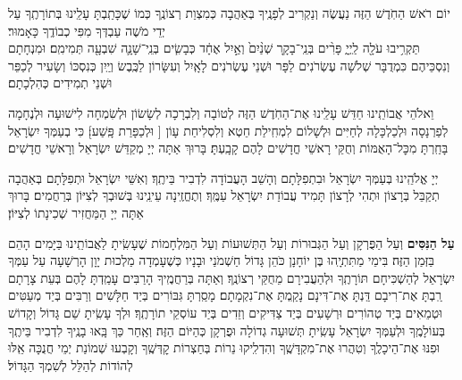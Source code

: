 \documentclass[twoside, openany, parskip=half, 11pt]{book}
\begin{document}
יוֹם רֹאשׁ הַחֹֽדֶשׁ
הַזֶּה נַעֲשֶׂה וְנַקְרִיב לְפָנֶֽיךָ בְּאַהֲבָה כְּמִצְוַת רְצוֹנֶֽךָ כְּמוֹ שֶׁכָּתַֽבְתָּ עָלֵֽינוּ בְּתוֹרָתֶֽךָ עַל יְדֵי מֹשֶׁה עַבְדְּךָ מִפִּי כְבוֹדֶֽךָ כָּאָמוּר׃\\
תַּקְרִ֥יבוּ עֹלָ֖ה לַֽיְיָ֑ פָּרִ֨ים בְּנֵֽי־בָקָ֤ר שְׁנַ֨יִם֙ וְאַ֣יִל אֶחָ֔ד כְּבָשִׂ֧ים בְּנֵֽי־שָׁנָ֛ה שִׁבְעָ֖ה תְּמִימִֽם׃ וּמִנְחָתָם וְנִסְכֵּיהֶם כִּמְדֻבָּר שְׁלֹשָׁה עֶשְׂרֹנִים לַפָּר וּשְׁנֵי עֶשְׂרֹנִים לָאָֽיִל וְעִשָּׂרוֹן לַכֶּֽבֶשׂ וְיַֽיִן כְּנִסְכּוֹ וְשָׂעִיר לְכַפֵּר וּשְׁנֵי תְמִידִים כְּהִלְכָתָם׃

וֵאלֹהֵי אֲבוֹתֵֽינוּ חַדֵּשׁ עָלֵֽינוּ אֶת־הַחֹֽדֶשׁ הַזֶּה לְטוֹבָה וְלִבְרָכָה לְשָׂשׂוֹן וּלְשִׂמְחָה לִישׁוּעָה וּלְנֶחָמָה לְפַרְנָסָה וּלְכַלְכָּלָה לְחַיִּים וּלְשָׁלוֹם לִמְחִֽילַת חֵטְא וְלִסְלִיחַת עָוֹן [
וּלְכַפָּרַת פָּֽשַׁע]׃ כִּי בְעַמְּךָ יִשְׂרָאֵל בָּחַֽרְתָּ מִכׇּל־הָאֻמּוֹת וְחֻקֵּי רָאשֵׁי חֳדָשִׁים לָהֶם קָבָֽעְתָּ׃ בָּרוּךְ אַתָּה יְיָ מְקַדֵּשׁ יִשְׂרָאֵל וְרָאשֵׁי חֳדָשִׁים׃

יְיָ אֱלֹהֵֽינוּ בְּעַמְּךָ יִשְׂרָאֵל וּבִתְפִלָּתָם וְהָשֵׁב הָעֲבוֹדָה לִדְבִיר בֵּיתֶֽךָ׃ וְאִשֵּׁי יִשְׂרָאֵל וּתְפִלָּתָם בְּאַהֲבָה תְקַבֵּל בְּרָצוֹן וּתְהִי לְרָצוֹן תָּמִיד עֲבוֹדַת יִשְׂרָאֵל עַמֶּֽךָ׃ וְתֶחֱזֶֽינָה עֵינֵֽינוּ בְּשׁוּבְךָ לְצִיּוֹן בְּרַחֲמִים׃ בָּרוּךְ אַתָּה יְיָ הַמַּחֲזִיר שְׁכִינָתוֹ לְצִיּוֹן׃

\modim

\enlargethispage{\baselineskip}

\begin{sometimes}

\textbf{עַל הַנִּסִּים}
וְעַל הַפֻּרְקָן וְעַל הַגְּבוּרוֹת וְעַל הַתְּשׁוּעוֹת וְעַל הַמִּלְחָמוֹת
שֶׁעָשִֽׂיתָ לַאֲבוֹתֵֽינוּ בַּיָּמִים הָהֵם בַּזְּמַן הַזֶּה׃
בִּימֵי מַתִּתְיָֽהוּ בֶּן יוֹחָנָן כֹּהֵן גָּדוֹל חַשְׁמֹנַי וּבָנָיו כְּשֶׁעָמְדָה מַלְכוּת יָוָן הָרְשָׁעָה עַל עַמְּךָ יִשְׂרָאֵל לְהַשְׁכִּיחָם תּוֹרָתֶֽךָ וּלְהַעֲבִירָם מֵחֻקֵּי רְצוֹנֶֽךָ׃ וְאַתָּה בְּרַחֲמֶֽיךָ הָרַבִּים עָמַֽדְתָּ לָהֶם בְּעֵת צָרָתָם רַֽבְתָּ אֶת־רִיבָם דַּֽנְתָּ אֶת־דִּינָם נָקַֽמְתָּ אֶת־נִקְמָתָם׃ מָסַֽרְתָּ גִּבּוֹרִים בְּיַד חַלָּשִׁים וְרַבִּים בְּיַד מְעַטִּים וּטְמֵאִים בְּיַד טְהוֹרִים וּרְשָׁעִים בְּיַד צַדִּיקִים וְזֵדִים בְּיַד עוֹסְקֵי תוֹרָתֶֽךָ׃ וּלְךָ עָשִֽׂיתָ שֵׁם גָּדוֹל וְקָדוֹשׁ בְּעוֹלָמֶֽךָ וּלְעַמְּךָ יִשְׂרָאֵל עָשִֽׂיתָ תְּשׁוּעָה גְדוֹלָה וּפֻרְקָן כְּהַיּוֹם הַזֶּה׃ וְאַֽחַר כַּךְ בָּֽאוּ בָנֶֽיךָ לִדְבִיר בֵּיתֶֽךָ וּפִנּוּ אֶת־הֵיכָלֶֽךָ וְטִהֲרוּ אֶת־מִקְדָּשֶֽׁךָ וְהִדְלִֽיקוּ נֵרוֹת בְּחַצְרוֹת קׇדְּשֶֽׁךָ וְקָבְעוּ שְׁמוֹנַת יְמֵי חֲנֻכָּה אֵֽלּוּ לְהוֹדוֹת לְהַלֵּל לְשִׁמְךָ הַגָּדוֹל׃

\end{sometimes}
\end{document}
